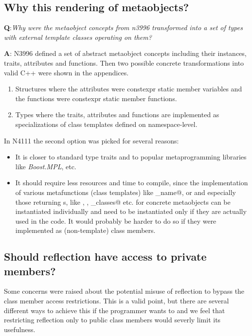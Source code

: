 \subsection{Why this rendering of metaobjects?}

{\textbf Q:}{\em Why were the metaobject concepts from n3996 transformed into a set
of types with external template classes operating on them?
}

{\textbf A:} N3996 defined a set of abstract metaobject concepts including their
instances, traits, attributes and functions.
Then two possible concrete transformations into valid C++ were shown in the appendices.

\begin{enumerate}
\item Structures where the attributes were constexpr static member variables and the functions were
constexpr static member functions.
\item Types where the traits, attributes and functions are implemented as specializations of
class templates defined on namespace-level.
\end{enumerate}

In N4111 the second option was picked for several reasons:

\begin{itemize}
\item It is closer to standard type traits and to popular metaprogramming libraries like {\em Boost.MPL}, etc.
\item It should require less resources and time to compile, since the implementation of various
metafunctions (class templates) like \verb@base_name@, \verb@scope@ or \verb@position@ and
especially those returning s, like \verb@members@, \verb@overloads@,
\verb@base_classes@ etc. for concrete metaobjects can be instantiated individually
and need to be instantiated only if they are actually used in the code. It would probably be harder
to do so if they were implemented as (non-template) class members.
\end{itemize}

\subsection{Should reflection have access to private members?}

Some concerns were raised about the potential misuse of reflection to
bypass the class member access restrictions. This is a valid point, but
there are several different ways to achieve this if the programmer
wants to and we feel that restricting reflection only to public class members
would severly limit its usefulness.
